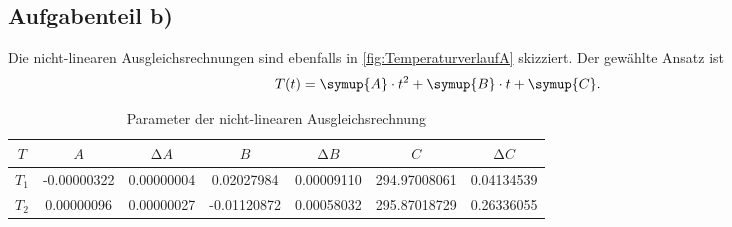 \documentclass{scrartcl} %
\begin{document}
  \subsection{Aufgabenteil b)}
    Die nicht-linearen Ausgleichsrechnungen sind ebenfalls in \ref{fig:TemperaturverlaufA} skizziert. Der gewählte Ansatz ist
    \begin{equation}
      T(t) = \symup{A} \cdot t^2 + \symup{B} \cdot t + \symup{C}.
      \label{eq:Regressionsgleichung}
    \end{equation}
    \begin{table}
      \centering
      \caption{Parameter der nicht-linearen Ausgleichsrechnung}
      \label{tab:regression1}
      \begin{tabular}{c S S S S S S}
        \toprule
         {$T$} & {$A$} & {$\increment A$} & {$B$} & {$\increment B$} & {$C$} & {$\increment C$} \\
        \midrule
        {$T_\text{1}$} & -0.00000322 &  0.00000004 &  0.02027984 & 0.00009110 & 294.97008061 & 0.04134539 \\
        {$T_\text{2}$} &  0.00000096 &  0.00000027 & -0.01120872 & 0.00058032 & 295.87018729 & 0.26336055 \\
        
          \bottomrule
      \end{tabular}
    \end{table}
\end{document}
